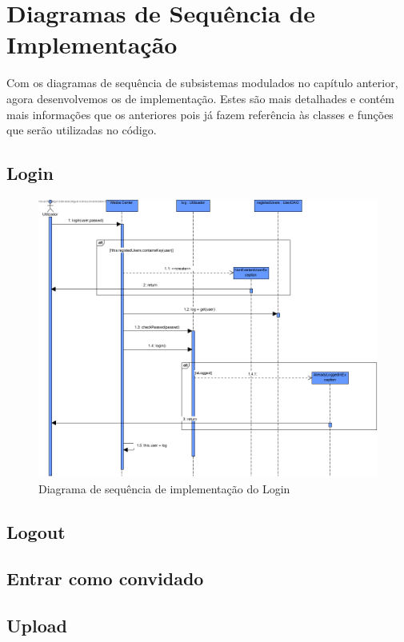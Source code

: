 \documentclass[a4paper]{report}
\begin{document}
\chapter{Diagramas de Sequência de Implementação}

Com os diagramas de sequência de subsistemas modulados no capítulo anterior,
agora desenvolvemos os de implementação. Estes são mais detalhades e contém
mais informações que os anteriores pois já fazem referência às classes e
funções que serão utilizadas no código.

\section{Login}

\begin{figure}[H]
	\centering 
    \includegraphics[width=\textwidth]{images/loginImp.png}  
    \caption{Diagrama de sequência de implementação do Login}
\end{figure}

\section{Logout}

\section{Entrar como convidado}

\section{Upload}
\end{document}
